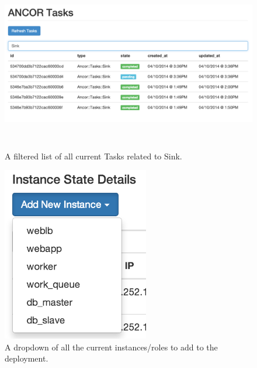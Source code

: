 \begin{figure}[htb]%

    \includegraphics[height=3.0in]{figures/tasks-filter.png}

    \caption[Tasks filter view.
    ]{A filtered list of all current Tasks related to Sink.}

    \label{tasksFilter}
\end{figure}

\begin{figure}[htb]%

    \includegraphics[height=3.0in]{figures/instance-dropdown.png}

    \caption[A dropdown of all current instances/roles.
    ]{A dropdown of all the current instances/roles to add to the deployment.}

    \label{dropdownRoles}
\end{figure}

